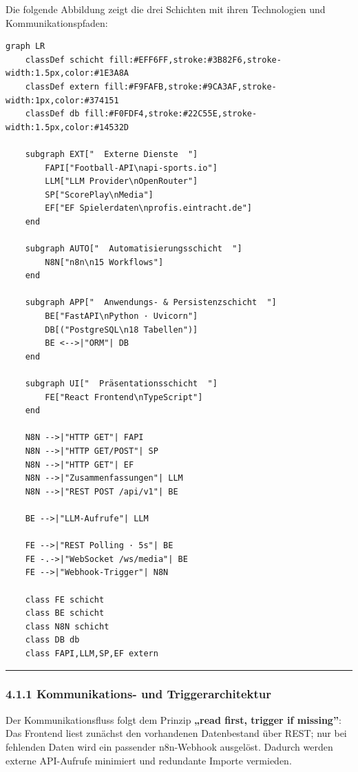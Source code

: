 Die folgende Abbildung zeigt die drei Schichten mit ihren Technologien
und Kommunikationspfaden:

\begin{lstlisting}
graph LR
    classDef schicht fill:#EFF6FF,stroke:#3B82F6,stroke-width:1.5px,color:#1E3A8A
    classDef extern fill:#F9FAFB,stroke:#9CA3AF,stroke-width:1px,color:#374151
    classDef db fill:#F0FDF4,stroke:#22C55E,stroke-width:1.5px,color:#14532D

    subgraph EXT["  Externe Dienste  "]
        FAPI["Football-API\napi-sports.io"]
        LLM["LLM Provider\nOpenRouter"]
        SP["ScorePlay\nMedia"]
        EF["EF Spielerdaten\nprofis.eintracht.de"]
    end

    subgraph AUTO["  Automatisierungsschicht  "]
        N8N["n8n\n15 Workflows"]
    end

    subgraph APP["  Anwendungs- & Persistenzschicht  "]
        BE["FastAPI\nPython · Uvicorn"]
        DB[("PostgreSQL\n18 Tabellen")]
        BE <-->|"ORM"| DB
    end

    subgraph UI["  Präsentationsschicht  "]
        FE["React Frontend\nTypeScript"]
    end

    N8N -->|"HTTP GET"| FAPI
    N8N -->|"HTTP GET/POST"| SP
    N8N -->|"HTTP GET"| EF
    N8N -->|"Zusammenfassungen"| LLM
    N8N -->|"REST POST /api/v1"| BE

    BE -->|"LLM-Aufrufe"| LLM

    FE -->|"REST Polling · 5s"| BE
    FE -.->|"WebSocket /ws/media"| BE
    FE -->|"Webhook-Trigger"| N8N

    class FE schicht
    class BE schicht
    class N8N schicht
    class DB db
    class FAPI,LLM,SP,EF extern
\end{lstlisting}

\begin{center}\rule{0.5\linewidth}{0.5pt}\end{center}

\subsubsection{4.1.1 Kommunikations- und
Triggerarchitektur}\label{kommunikations--und-triggerarchitektur}

Der Kommunikationsfluss folgt dem Prinzip \textbf{„read first, trigger
if missing''}: Das Frontend liest zunächst den vorhandenen Datenbestand
über REST; nur bei fehlenden Daten wird ein passender n8n-Webhook
ausgelöst. Dadurch werden externe API-Aufrufe minimiert und redundante
Importe vermieden.

